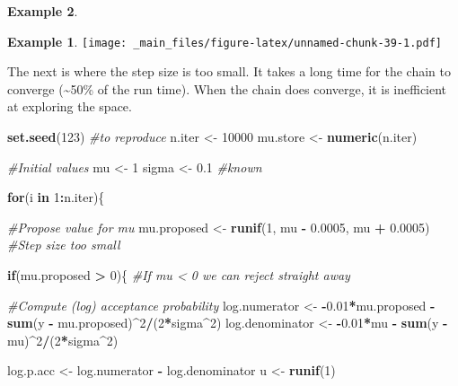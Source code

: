 \documentclass[
]{book}
\newenvironment{Shaded}{\begin{snugshade}}{\end{snugshade}}
\newcommand{\CommentTok}[1]{\textcolor[rgb]{0.56,0.35,0.01}{\textit{#1}}}
\newcommand{\ControlFlowTok}[1]{\textcolor[rgb]{0.13,0.29,0.53}{\textbf{#1}}}
\newcommand{\DecValTok}[1]{\textcolor[rgb]{0.00,0.00,0.81}{#1}}
\newcommand{\FloatTok}[1]{\textcolor[rgb]{0.00,0.00,0.81}{#1}}
\newcommand{\FunctionTok}[1]{\textcolor[rgb]{0.13,0.29,0.53}{\textbf{#1}}}
\newcommand{\NormalTok}[1]{#1}
\newcommand{\OtherTok}[1]{\textcolor[rgb]{0.56,0.35,0.01}{#1}}
\newcommand{\SpecialCharTok}[1]{\textcolor[rgb]{0.81,0.36,0.00}{\textbf{#1}}}
\theoremstyle{definition}
\theoremstyle{definition}
\newtheorem{example}{Example}[chapter]
\theoremstyle{definition}
\theoremstyle{definition}
\theoremstyle{remark}
\begin{document}
\begin{example}
\begin{example}
\texttt{[image: \_main\_files/figure-latex/unnamed-chunk-39-1.pdf]}

The next is where the step size is too small. It takes a long time for the chain to converge (\textasciitilde50\% of the run time). When the chain does converge, it is inefficient at exploring the space.

\begin{Shaded}
\begin{Highlighting}[]
\FunctionTok{set.seed}\NormalTok{(}\DecValTok{123}\NormalTok{) }\CommentTok{\#to reproduce}
\NormalTok{n.iter   }\OtherTok{\textless{}{-}} \DecValTok{10000}
\NormalTok{mu.store }\OtherTok{\textless{}{-}} \FunctionTok{numeric}\NormalTok{(n.iter)}

\CommentTok{\#Initial values}
\NormalTok{mu }\OtherTok{\textless{}{-}} \DecValTok{1} 
\NormalTok{sigma }\OtherTok{\textless{}{-}} \FloatTok{0.1} \CommentTok{\#known}

\ControlFlowTok{for}\NormalTok{(i }\ControlFlowTok{in} \DecValTok{1}\SpecialCharTok{:}\NormalTok{n.iter)\{}
  
  \CommentTok{\#Propose value for mu}
\NormalTok{  mu.proposed }\OtherTok{\textless{}{-}} \FunctionTok{runif}\NormalTok{(}\DecValTok{1}\NormalTok{, mu }\SpecialCharTok{{-}} \FloatTok{0.0005}\NormalTok{, mu }\SpecialCharTok{+} \FloatTok{0.0005}\NormalTok{) }\CommentTok{\#Step size too small}
  
  \ControlFlowTok{if}\NormalTok{(mu.proposed }\SpecialCharTok{\textgreater{}} \DecValTok{0}\NormalTok{)\{ }\CommentTok{\#If mu \textless{} 0 we can reject straight away}
    
    \CommentTok{\#Compute (log) acceptance probability}
\NormalTok{    log.numerator   }\OtherTok{\textless{}{-}} \SpecialCharTok{{-}}\FloatTok{0.01}\SpecialCharTok{*}\NormalTok{mu.proposed }\SpecialCharTok{{-}}
                        \FunctionTok{sum}\NormalTok{(y }\SpecialCharTok{{-}}\NormalTok{ mu.proposed)}\SpecialCharTok{\^{}}\DecValTok{2}\SpecialCharTok{/}\NormalTok{(}\DecValTok{2}\SpecialCharTok{*}\NormalTok{sigma}\SpecialCharTok{\^{}}\DecValTok{2}\NormalTok{)}
\NormalTok{    log.denominator }\OtherTok{\textless{}{-}} \SpecialCharTok{{-}}\FloatTok{0.01}\SpecialCharTok{*}\NormalTok{mu }\SpecialCharTok{{-}} \FunctionTok{sum}\NormalTok{(y }\SpecialCharTok{{-}}\NormalTok{ mu)}\SpecialCharTok{\^{}}\DecValTok{2}\SpecialCharTok{/}\NormalTok{(}\DecValTok{2}\SpecialCharTok{*}\NormalTok{sigma}\SpecialCharTok{\^{}}\DecValTok{2}\NormalTok{)}
    
\NormalTok{    log.p.acc }\OtherTok{\textless{}{-}}\NormalTok{ log.numerator }\SpecialCharTok{{-}}\NormalTok{ log.denominator}
\NormalTok{    u }\OtherTok{\textless{}{-}} \FunctionTok{runif}\NormalTok{(}\DecValTok{1}\NormalTok{)}
    

\end{Highlighting}
\end{Shaded}
\end{example}
\end{example}
\end{document}
